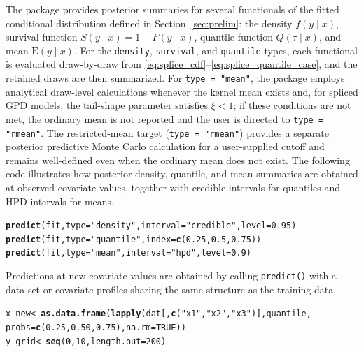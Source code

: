 \documentclass[article]{jss}\usepackage[]{graphicx}\usepackage[]{xcolor}
\makeatletter
\newcommand{\hlnum}[1]{\textcolor[rgb]{0.686,0.059,0.569}{#1}}%
\newcommand{\hlsng}[1]{\textcolor[rgb]{0.192,0.494,0.8}{#1}}%
\newcommand{\hldef}[1]{\textcolor[rgb]{0.345,0.345,0.345}{#1}}%
\newcommand{\hlkwb}[1]{\textcolor[rgb]{0.69,0.353,0.396}{#1}}%
\newcommand{\hlkwc}[1]{\textcolor[rgb]{0.333,0.667,0.333}{#1}}%
\newcommand{\hlkwd}[1]{\textcolor[rgb]{0.737,0.353,0.396}{\textbf{#1}}}%
\newenvironment{kframe}{%
 \def\at@end@of@kframe{}%
 \ifinner\ifhmode%
  \def\at@end@of@kframe{\end{minipage}}%
  \begin{minipage}{\columnwidth}%
 \fi\fi%
 \def\FrameCommand##1{\hskip\@totalleftmargin \hskip-\fboxsep
 \colorbox{shadecolor}{##1}\hskip-\fboxsep
     \hskip-\linewidth \hskip-\@totalleftmargin \hskip\columnwidth}%
 \MakeFramed {\advance\hsize-\width
   \@totalleftmargin\z@ \linewidth\hsize
   \@setminipage}}%
 {\par\unskip\endMakeFramed%
 \at@end@of@kframe}
\newenvironment{knitrout}{}{} %
\DeclareRobustCommand{\code}[1]{\nolinkurl{#1}}
\makeatother
\begin{document}
The package provides posterior summaries for several functionals of the
fitted conditional distribution defined in
Section~\ref{sec:prelim}: the density $f(y\mid x)$, survival function
$S(y\mid x) = 1 - F(y\mid x)$, quantile function $Q(\tau\mid x)$,
and mean $\mathrm{E}(y\mid x)$.  For the \code{density},
\code{survival}, and \code{quantile} types, each functional is
evaluated draw-by-draw from
\eqref{eq:splice_cdf}--\eqref{eq:splice_quantile_case}, and the
retained draws are then summarized.  For \code{type = "mean"}, the
package employs analytical draw-level calculations whenever the kernel
mean exists and, for spliced GPD models, the tail-shape parameter
satisfies $\xi < 1$; if these conditions are not met, the ordinary
mean is not reported and the user is directed to
\code{type = "rmean"}.  The restricted-mean target
(\code{type = "rmean"}) provides a separate posterior predictive Monte
Carlo calculation for a user-supplied cutoff and remains well-defined
even when the ordinary mean does not exist.  The following code
illustrates how posterior density, quantile, and mean summaries are
obtained at observed covariate values, together with credible intervals
for quantiles and HPD intervals for means.

\begin{knitrout}\footnotesize
{}\color{fgcolor}\begin{kframe}
\begin{alltt}
\hlkwd{predict}\hldef{(fit,} \hlkwc{type} \hldef{=} \hlsng{"density"}\hldef{,} \hlkwc{interval} \hldef{=} \hlsng{"credible"}\hldef{,} \hlkwc{level} \hldef{=} \hlnum{0.95}\hldef{)}
\hlkwd{predict}\hldef{(fit,} \hlkwc{type} \hldef{=} \hlsng{"quantile"}\hldef{,} \hlkwc{index} \hldef{=} \hlkwd{c}\hldef{(}\hlnum{0.25}\hldef{,} \hlnum{0.5}\hldef{,} \hlnum{0.75}\hldef{))}
\hlkwd{predict}\hldef{(fit,} \hlkwc{type} \hldef{=} \hlsng{"mean"}\hldef{,} \hlkwc{interval} \hldef{=} \hlsng{"hpd"}\hldef{,} \hlkwc{level} \hldef{=} \hlnum{0.9}\hldef{)}
\end{alltt}
\end{kframe}
\end{knitrout}

Predictions at new covariate values are obtained by calling
\code{predict()} with a data set or covariate profiles sharing the
same structure as the training data.

\begin{knitrout}\footnotesize
{}\color{fgcolor}\begin{kframe}
\begin{alltt}
\hldef{x_new} \hlkwb{<-} \hlkwd{as.data.frame}\hldef{(}\hlkwd{lapply}\hldef{(dat[,} \hlkwd{c}\hldef{(}\hlsng{"x1"}\hldef{,} \hlsng{"x2"}\hldef{,} \hlsng{"x3"}\hldef{)], quantile,}
                              \hlkwc{probs} \hldef{=} \hlkwd{c}\hldef{(}\hlnum{0.25}\hldef{,} \hlnum{0.50}\hldef{,} \hlnum{0.75}\hldef{),} \hlkwc{na.rm} \hldef{=} \hlnum{TRUE}\hldef{))}
\hldef{y_grid} \hlkwb{<-} \hlkwd{seq}\hldef{(}\hlnum{0}\hldef{,} \hlnum{10}\hldef{,} \hlkwc{length.out} \hldef{=} \hlnum{200}\hldef{)}
\end{alltt}
\end{kframe}
\end{knitrout}
\end{document}
